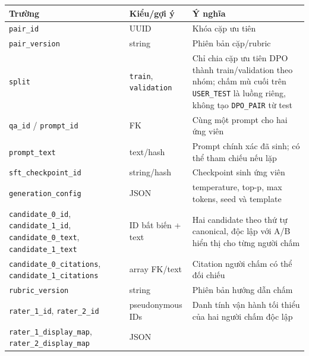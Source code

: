 \documentclass[11pt,a4paper]{article}
\begin{document}
{\def\LTcaptype{none} %
\begin{longtable}[]{@{}
  >{\raggedright\arraybackslash}p{}
  >{\raggedright\arraybackslash}p{}
  >{\raggedright\arraybackslash}p{}@{}}
\toprule\noalign{}
\begin{minipage}[b]{\linewidth}\raggedright
Trường
\end{minipage} & \begin{minipage}[b]{\linewidth}\raggedright
Kiểu/gợi ý
\end{minipage} & \begin{minipage}[b]{\linewidth}\raggedright
Ý nghĩa
\end{minipage} \\
\midrule\noalign{}
\endhead
\bottomrule\noalign{}
\endlastfoot
\nolinkurl{pair_id} & UUID & Khóa cặp ưu tiên \\
\nolinkurl{pair_version} & string & Phiên bản cặp/rubric \\
\nolinkurl{split} & \nolinkurl{train}, \nolinkurl{validation} & Chỉ chia
cặp ưu tiên DPO thành train/validation theo nhóm; chấm mù cuối trên
\nolinkurl{USER_TEST} là luồng riêng, không tạo \nolinkurl{DPO_PAIR} từ
test \\
\nolinkurl{qa_id} / \nolinkurl{prompt_id} & FK & Cùng một prompt cho hai
ứng viên \\
\nolinkurl{prompt_text} & text/hash & Prompt chính xác đã sinh; có thể
tham chiếu nếu lặp \\
\nolinkurl{sft_checkpoint_id} & string/hash & Checkpoint sinh ứng
viên \\
\nolinkurl{generation_config} & JSON & temperature, top-p, max tokens,
seed và template \\
\nolinkurl{candidate_0_id}, \nolinkurl{candidate_1_id},
\nolinkurl{candidate_0_text}, \nolinkurl{candidate_1_text} & ID bất biến
+ text & Hai candidate theo thứ tự canonical, độc lập với A/B hiển thị
cho từng người chấm \\
\nolinkurl{candidate_0_citations}, \nolinkurl{candidate_1_citations} &
array FK/text & Citation người chấm có thể đối chiếu \\
\nolinkurl{rubric_version} & string & Phiên bản hướng dẫn chấm \\
\nolinkurl{rater_1_id}, \nolinkurl{rater_2_id} & pseudonymous IDs & Danh
tính vận hành tối thiểu của hai người chấm độc lập \\
\nolinkurl{rater_1_display_map}, \nolinkurl{rater_2_display_map} & JSON

\end{longtable}}
\end{document}

